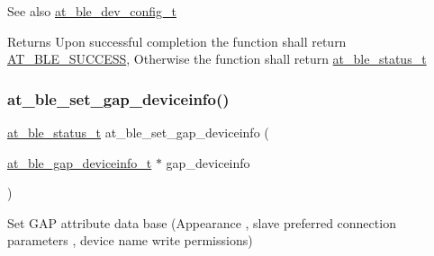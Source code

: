 \begin{DoxySeeAlso}{See also}
\mbox{\hyperlink{structat__ble__dev__config__t}{at\+\_\+ble\+\_\+dev\+\_\+config\+\_\+t}}
\end{DoxySeeAlso}
\begin{DoxyReturn}{Returns}
Upon successful completion the function shall return \mbox{\hyperlink{group__error__codes__group_gga3b1db9b95feb157b3c188ca27fe76988a7e3bfff5387331cd4f2c56cbcbbd7e19}{A\+T\+\_\+\+B\+L\+E\+\_\+\+S\+U\+C\+C\+E\+SS}}, Otherwise the function shall return \mbox{\hyperlink{at__ble__api_8h_ace24eb4e5ca3f325c663b809da5feb92}{at\+\_\+ble\+\_\+status\+\_\+t}} 
\end{DoxyReturn}
\mbox{\label{group__gap__dev__config__group_gaed47ccba87a2a4989e49243c5de5a767}} 
\subsubsection{\texorpdfstring{at\_ble\_set\_gap\_deviceinfo()}{at\_ble\_set\_gap\_deviceinfo()}}
{\footnotesize\ttfamily \mbox{\hyperlink{group__error__codes__group_ga3b1db9b95feb157b3c188ca27fe76988}{at\+\_\+ble\+\_\+status\+\_\+t}} at\+\_\+ble\+\_\+set\+\_\+gap\+\_\+deviceinfo (\begin{DoxyParamCaption}\item[{\mbox{\hyperlink{structat__ble__gap__deviceinfo__t}{at\+\_\+ble\+\_\+gap\+\_\+deviceinfo\+\_\+t}} $\ast$}]{gap\+\_\+deviceinfo }\end{DoxyParamCaption})}



Set G\+AP attribute data base (Appearance , slave preferred connection parameters , device name write permissions) 


